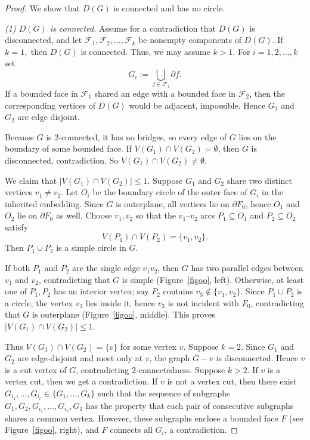 \documentclass[12pt]{amsart}
\theoremstyle{theorem}%
\theoremstyle{definition}%
\begin{document}
\begin{proof}
We show that $D(G)$ is connected and has no circle.

\smallskip
\noindent\emph{(1) $D(G)$ is connected.}
Assume for a contradiction that $D(G)$ is disconnected, and let $\mathcal F_1,\mathcal F_2,...,\mathcal F_k$ be  nonempty
components of $D(G)$. If $k=1,$ then $D(G)$ is connected. Thus, we may assume $k>1$. For $i=1,2,...,k$ set
\[
G_i:=\bigcup_{f\in\mathcal F_i}\partial f.
\]
If a bounded face in $\mathcal F_1$ shared an edge with a bounded face in $\mathcal F_2$, then the corresponding
vertices of $D(G)$ would be adjacent, impossible. Hence $G_1$ and $G_2$ are edge disjoint.

Because $G$ is $2$-connected, it has no bridges, so every edge of $G$ lies on the boundary of some bounded face.
If $V(G_1)\cap V(G_2)=\emptyset$, then $G$ is disconnected,
contradiction. So $V(G_1)\cap V(G_2)\neq\emptyset$.

We claim that $|V(G_1)\cap V(G_2)|\le 1$.  Suppose $G_1$ and $G_2$ share two distinct vertices $v_1\neq v_2$.
Let $O_i$ be the boundary circle of the outer face of $G_i$ in the inherited embedding. Since $G$ is outerplane,
all vertices lie on $\partial F_0$, hence $O_1$ and $O_2$ lie on $\partial F_0$ as well. Choose $v_1,v_2$ so that
the $v_1$--$v_2$ arcs $P_1\subseteq O_1$ and $P_2\subseteq O_2$ satisfy
\[
V(P_1)\cap V(P_2)=\{v_1,v_2\}.
\]
Then $P_1\cup P_2$ is a simple circle in $G$.

If both $P_1$ and $P_2$ are the single edge $v_1v_2$, then $G$ has two parallel edges between $v_1$ and $v_2$,
contradicting that $G$ is simple (Figure~\ref{figoo}, left). Otherwise, at least one of $P_1,P_2$ has an interior
vertex; say $P_2$ contains $v_3\notin\{v_1,v_2\}$. Since $P_1\cup P_2$ is a  circle, the vertex $v_3$ lies
 inside it, hence $v_3$ is not incident with $F_0$, contradicting that $G$ is outerplane
(Figure~\ref{figoo}, middle). This proves $|V(G_1)\cap V(G_2)|\le 1$.

Thus $V(G_1)\cap V(G_2)=\{v\}$ for some vertex $v$. Suppose $k=2$.
Since $G_1$ and $G_2$ are edge-disjoint and meet only at $v$,
the graph $G-v$ is disconnected. Hence $v$ is a cut vertex of $G$,
contradicting $2$-connectedness. Suppose $k>2$. If $v$ is a vertex cut, then we get a contradiction.
If $v$ is not a vertex cut, then there exist
$G_{i_1},\dots,G_{i_r}\in\{G_1,\dots,G_k\}$
such that the sequence of subgraphs
$G_1,G_2,G_{i_1},\dots,G_{i_r},G_1$
has the property that each pair of consecutive subgraphs shares a common vertex.
However, these subgraphs enclose a bounded face $F$ (see Figure~\ref{figoo}, right),
and $F$ connects all $G_i$, a contradiction.


\end{proof}
\end{document}
